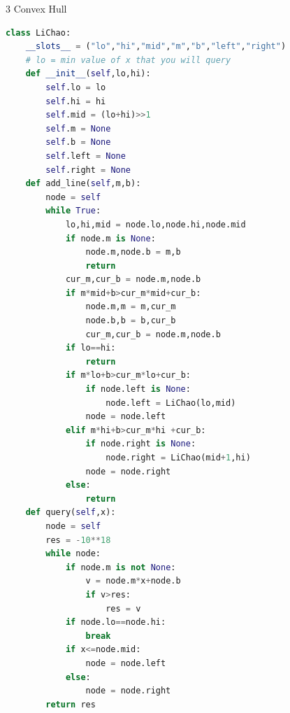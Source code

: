 \documentclass[10pt,landscape, a4paper]{article}
\begin{document}
\begin{multicols*}{3}
Convex Hull
\begin{lstlisting}[language=Python]
class LiChao:
    __slots__ = ("lo","hi","mid","m","b","left","right")
    # lo = min value of x that you will query
    def __init__(self,lo,hi):
        self.lo = lo
        self.hi = hi
        self.mid = (lo+hi)>>1
        self.m = None
        self.b = None
        self.left = None
        self.right = None
    def add_line(self,m,b):
        node = self
        while True:
            lo,hi,mid = node.lo,node.hi,node.mid
            if node.m is None:
                node.m,node.b = m,b
                return
            cur_m,cur_b = node.m,node.b
            if m*mid+b>cur_m*mid+cur_b:
                node.m,m = m,cur_m
                node.b,b = b,cur_b
                cur_m,cur_b = node.m,node.b
            if lo==hi:
                return
            if m*lo+b>cur_m*lo+cur_b:
                if node.left is None:
                    node.left = LiChao(lo,mid)
                node = node.left
            elif m*hi+b>cur_m*hi +cur_b:
                if node.right is None:
                    node.right = LiChao(mid+1,hi)
                node = node.right
            else:
                return
    def query(self,x):
        node = self
        res = -10**18
        while node:
            if node.m is not None:
                v = node.m*x+node.b
                if v>res:
                    res = v
            if node.lo==node.hi:
                break
            if x<=node.mid:
                node = node.left
            else:
                node = node.right
        return res
\end{lstlisting}


\end{multicols*}
\end{document}

